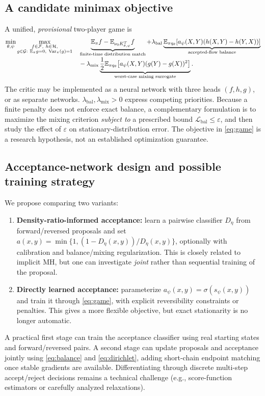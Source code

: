 \documentclass[11pt]{article}
\newcommand{\bbE}{\mathbb{E}}
\begin{document}
\subsection{A candidate minimax objective}
A unified, \emph{provisional} two-player game is
\begin{align}
\min_{\theta,\psi}\max_{\substack{f\in\mathcal F,\ h\in\mathcal H,\\
                                     g\in\mathcal G:\ \bbE_\pi g=0,\ \operatorname{Var}_\pi(g)=1}}
\quad &\underbrace{\bbE_\pi f-\bbE_{\nu_0K_{\theta,\psi}^{T}}f}_{\text{finite-time distribution match}}
+\lambda_{\mathrm{bal}}
\underbrace{\bbE_{\pi q_\theta}\!\left[a_\psi(X,Y)(h(X,Y)-h(Y,X))\right]}_{\text{accepted-flow balance}}
\notag\\[-0.2em]
&-\lambda_{\mathrm{mix}}
\underbrace{\frac12\bbE_{\pi q_\theta}\!\left[a_\psi(X,Y)(g(Y)-g(X))^2\right]}_{\text{worst-case mixing surrogate}}.
\label{eq:game}
\end{align}
The critic may be implemented as a neural network with three heads $(f,h,g)$, or as separate networks. $\lambda_{\mathrm{bal}},\lambda_{\mathrm{mix}}>0$ express competing priorities. Because a finite penalty does not enforce exact balance, a complementary formulation is to maximize the mixing criterion \emph{subject to} a prescribed bound $\mathcal L_{\mathrm{bal}}\le\varepsilon$, and then study the effect of $\varepsilon$ on stationary-distribution error. The objective in \eqref{eq:game} is a research hypothesis, not an established optimization guarantee.

\subsection{Acceptance-network design and possible training strategy}
We propose comparing two variants:
\begin{enumerate}
\item \textbf{Density-ratio-informed acceptance:} learn a pairwise classifier $D_\eta$ from forward/reversed proposals and set $a(x,y)=\min\{1,(1-D_\eta(x,y))/D_\eta(x,y)\}$, optionally with calibration and balance/mixing regularization. This is closely related to implicit MH, but one can investigate \emph{joint} rather than sequential training of the proposal.
\item \textbf{Directly learned acceptance:} parameterize $a_\psi(x,y)=\sigma(s_\psi(x,y))$ and train it through \eqref{eq:game}, with explicit reversibility constraints or penalties. This gives a more flexible objective, but exact stationarity is no longer automatic.
\end{enumerate}
A practical first stage can train the acceptance classifier using real starting states and forward/reversed pairs. A second stage can update proposals and acceptance jointly using \eqref{eq:balance} and \eqref{eq:dirichlet}, adding short-chain endpoint matching once stable gradients are available. Differentiating through discrete multi-step accept/reject decisions remains a technical challenge (e.g., score-function estimators or carefully analyzed relaxations).
\end{document}
